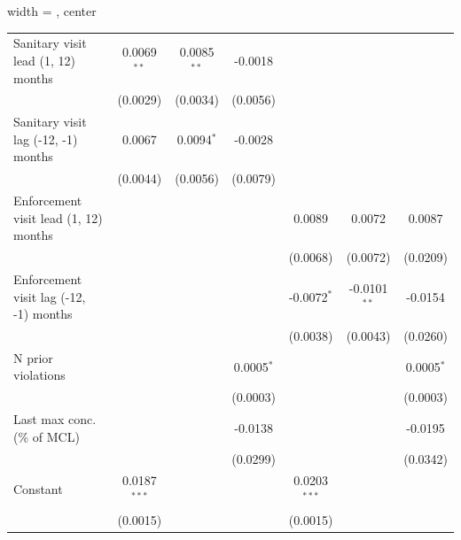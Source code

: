 \begin{table}[htbp]
\begin{adjustbox}{width = \textwidth, center}
\begin{tabular}{lcccccc}
         \midrule 
         Sanitary visit lead (1, 12) months     & 0.0069$^{**}$  & 0.0085$^{**}$ & -0.0018       &                &                &   \\   
                                                & (0.0029)       & (0.0034)      & (0.0056)      &                &                &   \\   
         Sanitary visit lag (-12, -1) months    & 0.0067         & 0.0094$^{*}$  & -0.0028       &                &                &   \\   
                                                & (0.0044)       & (0.0056)      & (0.0079)      &                &                &   \\   
         Enforcement visit lead (1, 12) months  &                &               &               & 0.0089         & 0.0072         & 0.0087\\   
                                                &                &               &               & (0.0068)       & (0.0072)       & (0.0209)\\   
         Enforcement visit lag (-12, -1) months &                &               &               & -0.0072$^{*}$  & -0.0101$^{**}$ & -0.0154\\   
                                                &                &               &               & (0.0038)       & (0.0043)       & (0.0260)\\   
         N prior violations                     &                &               & 0.0005$^{*}$  &                &                & 0.0005$^{*}$\\   
                                                &                &               & (0.0003)      &                &                & (0.0003)\\   
         Last max conc. (\% of MCL)             &                &               & -0.0138       &                &                & -0.0195\\   
                                                &                &               & (0.0299)      &                &                & (0.0342)\\   
         Constant                               & 0.0187$^{***}$ &               &               & 0.0203$^{***}$ &                &   \\   
                                                & (0.0015)       &               &               & (0.0015)       &                &   \\   
         

\end{tabular}
\end{adjustbox}
\end{table}
